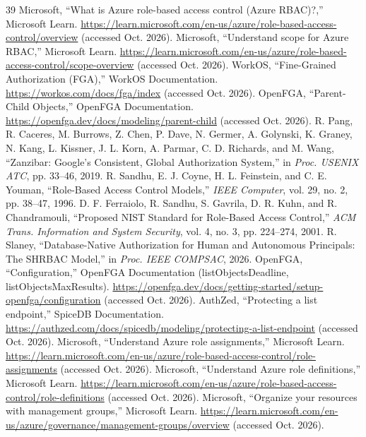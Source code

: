 \documentclass[conference]{IEEEtran}
\begin{document}
\balance

\begin{thebibliography}{39}
 Microsoft, ``What is Azure role-based access control (Azure RBAC)?,'' Microsoft Learn. \url{https://learn.microsoft.com/en-us/azure/role-based-access-control/overview} (accessed Oct. 2026).
 Microsoft, ``Understand scope for Azure RBAC,'' Microsoft Learn. \url{https://learn.microsoft.com/en-us/azure/role-based-access-control/scope-overview} (accessed Oct. 2026).
 WorkOS, ``Fine-Grained Authorization (FGA),'' WorkOS Documentation. \url{https://workos.com/docs/fga/index} (accessed Oct. 2026).
 OpenFGA, ``Parent-Child Objects,'' OpenFGA Documentation. \url{https://openfga.dev/docs/modeling/parent-child} (accessed Oct. 2026).
 R. Pang, R. Caceres, M. Burrows, Z. Chen, P. Dave, N. Germer, A. Golynski, K. Graney, N. Kang, L. Kissner, J. L. Korn, A. Parmar, C. D. Richards, and M. Wang, ``Zanzibar: Google's Consistent, Global Authorization System,'' in \emph{Proc. USENIX ATC}, pp. 33--46, 2019.
 R. Sandhu, E. J. Coyne, H. L. Feinstein, and C. E. Youman, ``Role-Based Access Control Models,'' \emph{IEEE Computer}, vol. 29, no. 2, pp. 38--47, 1996.
 D. F. Ferraiolo, R. Sandhu, S. Gavrila, D. R. Kuhn, and R. Chandramouli, ``Proposed NIST Standard for Role-Based Access Control,'' \emph{ACM Trans. Information and System Security}, vol. 4, no. 3, pp. 224--274, 2001.
 R. Slaney, ``Database-Native Authorization for Human and Autonomous Principals: The SHRBAC Model,'' in \emph{Proc. IEEE COMPSAC}, 2026.
 OpenFGA, ``Configuration,'' OpenFGA Documentation (listObjectsDeadline, listObjectsMaxResults). \url{https://openfga.dev/docs/getting-started/setup-openfga/configuration} (accessed Oct. 2026).
 AuthZed, ``Protecting a list endpoint,'' SpiceDB Documentation. \url{https://authzed.com/docs/spicedb/modeling/protecting-a-list-endpoint} (accessed Oct. 2026).
 Microsoft, ``Understand Azure role assignments,'' Microsoft Learn. \url{https://learn.microsoft.com/en-us/azure/role-based-access-control/role-assignments} (accessed Oct. 2026).
 Microsoft, ``Understand Azure role definitions,'' Microsoft Learn. \url{https://learn.microsoft.com/en-us/azure/role-based-access-control/role-definitions} (accessed Oct. 2026).
 Microsoft, ``Organize your resources with management groups,'' Microsoft Learn. \url{https://learn.microsoft.com/en-us/azure/governance/management-groups/overview} (accessed Oct. 2026).

\end{thebibliography}
\end{document}
